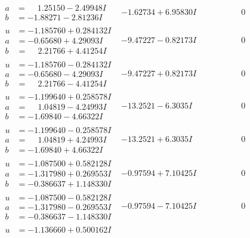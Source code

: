 \documentclass[1p]{elsarticle_modified}
\theoremstyle{definition}
\begin{document}
$$\begin{array}{c|c|c}
\begin{aligned}
a &= \phantom{-}1.25150 - 2.49948 I \\
b &= -1.88271 - 2.81236 I\end{aligned}
 & -1.62734 + 6.95830 I & \phantom{-0.000000 } 0 \\ \hline\begin{aligned}
u &= -1.185760 + 0.284132 I \\
a &= -0.65680 + 4.29093 I \\
b &= \phantom{-}2.21766 + 4.41254 I\end{aligned}
 & -9.47227 - 0.82173 I & \phantom{-0.000000 } 0 \\ \hline\begin{aligned}
u &= -1.185760 - 0.284132 I \\
a &= -0.65680 - 4.29093 I \\
b &= \phantom{-}2.21766 - 4.41254 I\end{aligned}
 & -9.47227 + 0.82173 I & \phantom{-0.000000 } 0 \\ \hline\begin{aligned}
u &= -1.199640 + 0.258578 I \\
a &= \phantom{-}1.04819 - 4.24993 I \\
b &= -1.69840 - 4.66322 I\end{aligned}
 & -13.2521 - 6.3035 I & \phantom{-0.000000 } 0 \\ \hline\begin{aligned}
u &= -1.199640 - 0.258578 I \\
a &= \phantom{-}1.04819 + 4.24993 I \\
b &= -1.69840 + 4.66322 I\end{aligned}
 & -13.2521 + 6.3035 I & \phantom{-0.000000 } 0 \\ \hline\begin{aligned}
u &= -1.087500 + 0.582128 I \\
a &= -1.317980 + 0.269553 I \\
b &= -0.386637 + 1.148330 I\end{aligned}
 & -0.97594 + 7.10425 I & \phantom{-0.000000 } 0 \\ \hline\begin{aligned}
u &= -1.087500 - 0.582128 I \\
a &= -1.317980 - 0.269553 I \\
b &= -0.386637 - 1.148330 I\end{aligned}
 & -0.97594 - 7.10425 I & \phantom{-0.000000 } 0 \\ \hline\begin{aligned}
u &= -1.136660 + 0.500162 I \\

\end{aligned}
\end{array}$$
\end{document}

